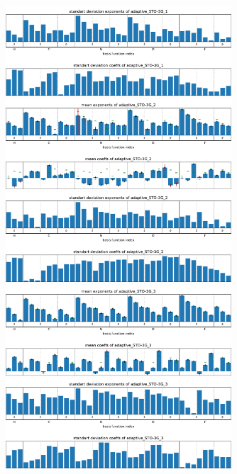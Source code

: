 \begin{figure}
    \includegraphics[width=0.75\textwidth]{chapters/results/results_images/adaptive_basis_functions/std_exps_and_coeffsadaptive_STO-3G_1}
    \includegraphics[width=0.75\textwidth]{chapters/results/results_images/adaptive_basis_functions/mean_exps_and_coeffsadaptive_STO-3G_2}
    \includegraphics[width=0.75\textwidth]{chapters/results/results_images/adaptive_basis_functions/std_exps_and_coeffsadaptive_STO-3G_2}
    \includegraphics[width=0.75\textwidth]{chapters/results/results_images/adaptive_basis_functions/mean_exps_and_coeffsadaptive_STO-3G_3}
    \includegraphics[width=0.75\textwidth]{chapters/results/results_images/adaptive_basis_functions/std_exps_and_coeffsadaptive_STO-3G_3}
\end{figure}






